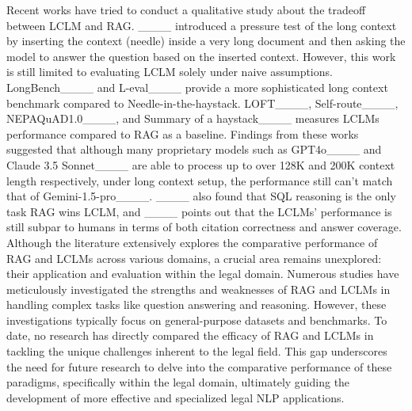 {
Recent works have tried to conduct a qualitative study about the tradeoff between LCLM and RAG. 
%
____ introduced a pressure test of the long context by inserting the context (needle) inside a very long document and then asking the model to answer the question based on the inserted context. 
%
However, this work is still limited to evaluating LCLM solely under naive assumptions. 
%
LongBench____ and L-eval____ provide a more sophisticated long context benchmark compared to Needle-in-the-haystack. 
%
LOFT____, Self-route____, NEPAQuAD1.0____, and Summary of a haystack____ measures LCLMs performance compared to RAG as a baseline. 
%
Findings from these works suggested that although many proprietary models such as GPT4o____ and Claude 3.5 Sonnet____ are able to process up to over 128K and 200K context length respectively, under long context setup, the performance still can't match that of Gemini-1.5-pro____. 
%
____ also found that SQL reasoning is the only task RAG wins LCLM, and ____ points out that the LCLMs' performance is still subpar to humans in terms of both citation correctness and answer coverage. 
}
%
Although the literature extensively explores the comparative performance of RAG and LCLMs across various domains, a crucial area remains unexplored: their application and evaluation within the legal domain. 
%
Numerous studies have meticulously investigated the strengths and weaknesses of RAG and LCLMs in handling complex tasks like question answering and reasoning. 
%
However, these investigations typically focus on general-purpose datasets and benchmarks. 
%
To date, no research has directly compared the efficacy of RAG and LCLMs in tackling the unique challenges inherent to the legal field. 
%
This gap underscores the need for future research to delve into the comparative performance of these paradigms, specifically within the legal domain, ultimately guiding the development of more effective and specialized legal NLP applications.